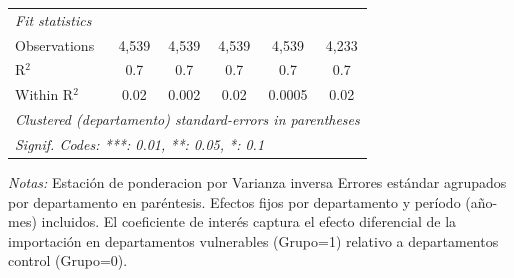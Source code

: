\documentclass[12pt]{article}
\begin{document}
\begin{table}[htbp]
\begin{threeparttable}
\begin{tabular}{lccccc}
      \midrule
      \emph{Fit statistics}\\
      Observations                                      & 4,539                   & 4,539                   & 4,539                 & 4,539                    & 4,233\\  
      R$^2$                                             & 0.7                     & 0.7                     & 0.7                   & 0.7                      & 0.7\\  
      Within R$^2$                                      & 0.02                    & 0.002                   & 0.02                  & 0.0005                   & 0.02\\  
      \midrule \midrule
      \multicolumn{6}{l}{\emph{Clustered (departamento) standard-errors in parentheses}}\\
      \multicolumn{6}{l}{\emph{Signif. Codes: ***: 0.01, **: 0.05, *: 0.1}}\\
   \end{tabular}


\begin{tablenotes}
\footnotesize
\item \textit{Notas:} Estación de ponderacion por Varianza inversa
Errores estándar agrupados por departamento en paréntesis.
Efectos fijos por departamento y período (año-mes) incluidos.
El coeficiente de interés captura el efecto diferencial de la importación
en departamentos vulnerables (Grupo=1) relativo a departamentos control (Grupo=0).
\end{tablenotes}
\end{threeparttable}
\end{table}
\end{document}
